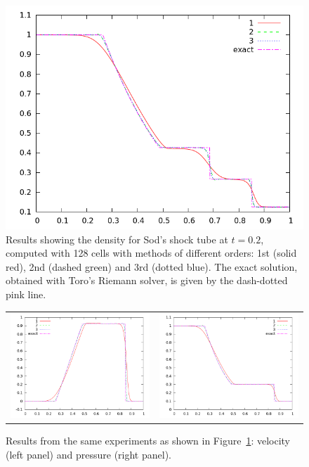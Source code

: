\documentclass[10pt]{article}
\begin{document}
\begin{figure}[h]
  \begin{center}
    \includegraphics[width=.78\textwidth]{den128comp_20}
  \end{center}
  \caption{Results showing the density for Sod's shock tube at $t=0.2$, computed with 128 cells with methods of different orders: 1st (solid red), 2nd (dashed green) and 3rd (dotted blue). The exact solution, obtained with Toro's Riemann solver, is given by the dash-dotted pink line.}
  \label{fig:den128comp}
\end{figure}

\begin{figure}
  \begin{center}
	\begin{tabular}{cc}
      \includegraphics[width=.425\textwidth]{vel128comp_20} &
	  \includegraphics[width=.425\textwidth]{prs128comp_20}
	\end{tabular}
  \end{center}
  \caption{Results from the same experiments as shown in Figure~\ref{fig:den128comp}:
  velocity (left panel) and pressure (right panel).}
\end{figure}
\end{document}
